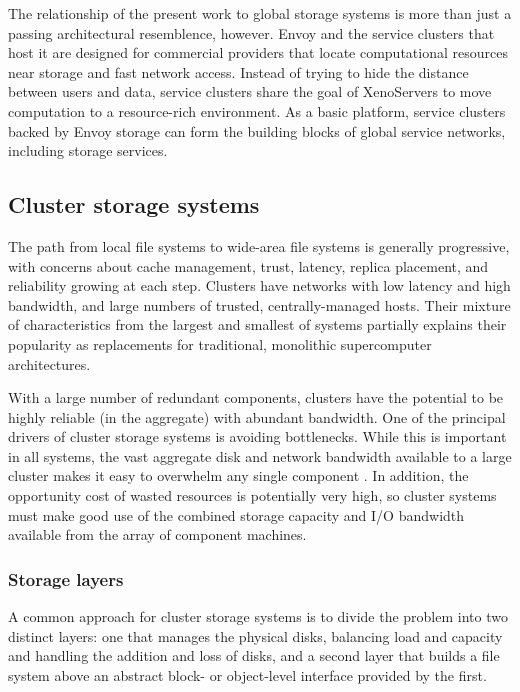 The relationship of the present work to global storage systems is more than just a passing architectural resemblence, however. Envoy and the service clusters that host it are designed for commercial providers that locate computational resources near storage and fast network access. Instead of trying to hide the distance between users and data, service clusters share the goal of XenoServers \cite{reed} to move computation to a resource-rich environment. As a basic platform, service clusters backed by Envoy storage can form the building blocks of global service networks, including storage services.

\subsection{Cluster storage systems}

The path from local file systems to wide-area file systems is generally progressive, with concerns about cache management, trust, latency, replica placement, and reliability growing at each step. Clusters have networks with low latency and high bandwidth, and large numbers of trusted, centrally-managed hosts. Their mixture of characteristics from the largest and smallest of systems partially explains their popularity as replacements for traditional, monolithic supercomputer architectures.

With a large number of redundant components, clusters have the potential to be highly reliable (in the aggregate) with abundant bandwidth. One of the principal drivers of cluster storage systems is avoiding bottlenecks. While this is important in all systems, the vast aggregate disk and network bandwidth available to a large cluster makes it easy to overwhelm any single component \cite{hospodor}. In addition, the opportunity cost of wasted resources is potentially very high, so cluster systems must make good use of the combined storage capacity and I/O bandwidth available from the array of component machines.

\subsubsection{Storage layers}\label{sec:storage-layer-systems}

A common approach for cluster storage systems is to divide the problem into two distinct layers: one that manages the physical disks, balancing load and capacity and handling the addition and loss of disks, and a second layer that builds a file system above an abstract block- or object-level interface provided by the first.

